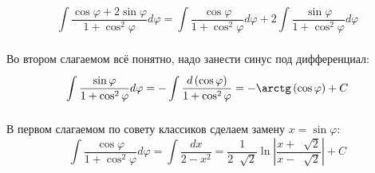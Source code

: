 \documentclass[../main.tex]{subfiles}
\begin{document}
\begin{example}
    
    ~

    \[ \displaystyle\int\limits_{ }^{ } \dfrac{ \cos\varphi+2\sin\varphi}{ 1+ \cos^2 \varphi } d \varphi = \displaystyle\int\limits_{ }^{ } \dfrac{ \cos\varphi}{ 1+\cos^2 \varphi } d \varphi + 2\displaystyle\int\limits_{ }^{ } \dfrac{ \sin\varphi}{ 1+\cos^2 \varphi } d \varphi  \]

    Во втором слагаемом всё понятно, надо занести синус под дифференциал:
    \[ \displaystyle\int\limits_{ }^{ } \dfrac{ \sin\varphi}{ 1+\cos^2 \varphi } d \varphi= -\displaystyle\int\limits_{ }^{ } \dfrac{ d\left(\cos\varphi\right)}{ 1+\cos^2 \varphi }=-\arctg \left( \cos \varphi \right) +C\]

    В первом слагаемом по совету классиков сделаем замену \( x = \sin \varphi \):
    \[ \displaystyle\int\limits_{ }^{ } \dfrac{ \cos\varphi}{ 1+\cos^2 \varphi } d \varphi= \displaystyle\int\limits_{ }^{ } \dfrac{ dx}{ 2-x^2} = \dfrac{ 1}{ 2 \;\sqrt[]{2}} \ln \left| \dfrac{ x+\;\sqrt[]{2}}{ x- \;\sqrt[]{2}}\right| +C\]
\end{example}
\end{document}
